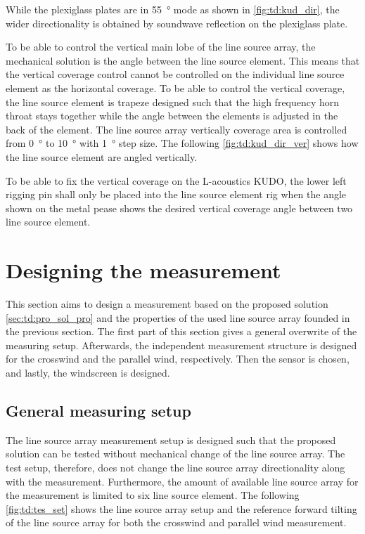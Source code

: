 
While the plexiglass plates are in \SI{55}{\degree} mode as shown in \autoref{fig:td:kud_dir}, the wider directionality is obtained by soundwave reflection on the plexiglass plate.

To be able to control the vertical main lobe of the line source array, the mechanical solution is the angle between the line source element. This means that the vertical coverage control cannot be controlled on the individual line source element as the horizontal coverage. To be able to control the vertical coverage, the line source element is trapeze designed such that the high frequency horn throat stays together while the angle between the elements is adjusted in the back of the element. The line source array vertically coverage area is controlled from \SI{0}{\degree} to \SI{10}{\degree} with \SI{1}{\degree} step size. The following \autoref{fig:td:kud_dir_ver} shows how the line source element are angled vertically.


To be able to fix the vertical coverage on the L-acoustics KUDO, the lower left rigging pin shall only be placed into the line source element rig when the angle shown on the metal pease shows the desired vertical coverage angle between two line source element.  


\section{Designing the measurement}\label{sec:des:des_mes}
This section aims to design a measurement based on the proposed solution \autoref{sec:td:pro_sol_pro} and the properties of the used line source array founded in the previous section. The first part of this section gives a general overwrite of the measuring setup. Afterwards, the independent measurement structure is designed for the crosswind and the parallel wind, respectively. Then the sensor is chosen, and lastly, the windscreen is designed.


\subsection{General measuring setup}\label{sec:pro:test_setup}
The line source array measurement setup is designed such that the proposed solution can be tested without mechanical change of the line source array. The test setup, therefore, does not change the line source array directionality along with the measurement. Furthermore, the amount of available line source array for the measurement is limited to six line source element. The following \autoref{fig:td:tes_set} shows the line source array setup and the reference forward tilting of the line source array for both the crosswind and parallel wind measurement. 

